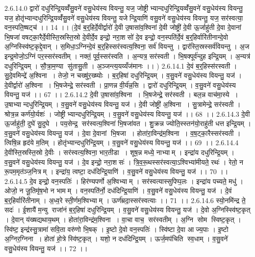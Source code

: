 2.6.14.0
द्वारो॑ दधुरिन्द्रि॒यव्वँ॑सु॒वने॑ वसु॒धेय॑स्य वियन्तु॒ यज॒ जोष्ट्रीभ्यान्दधुरिन्द्रि॒यव्वँ॑सु॒वने॑ वसु॒धेय॑स्य वियन्तु॒ यज॒ होतृ॑भ्यान्दधुरिन्द्रि॒यव्वँ॑सु॒वने॑ वसु॒धेय॑स्य वियन्तु॒ यजेन्द्रि॒याणि॑ वसु॒वने॑ वसु॒धेय॑स्य वियन्तु॒ यज॒ सर॑स्वत्या॒ वन॒स्पति॒ष्षट्च॑ ।। 14 ।। (दे॒वं ब॒र्॒हिर्दे॒वीर्द्वारो॑ दे॒वी उ॒षासा॑व॒श्विना॑ दे॒वी जोष्ट्री॑ दे॒वी ऊ॒र्जाहु॑ती दे॒वा दे॒वानां भि॒षजा॑ वषट्का॒रैर्दे॒वीस्ति॒स्रस्ति॒स्रो दे॒वीर्दे॒व इन्द्रो॒ नरा॒शसो॑ दे॒व इन्द्रो॒ वन॒स्पति॑र्दे॒वं ब॒र्॒हिर्वारि॑तीनान्दे॒वो अ॒ग्निस्स्वि॑ष्ट॒कृद्दे॒वान् । स॒मिधा॒ऽग्निन्दे॒वं ब॒र्॒हिस्सर॑स्वत्य॒श्विना॒ सर्व॑ वियन्तु । द्वार॑स्ति॒स्रस्सर्व॑वियन्तु । अ॒ज इन्द्र॒मोजो॒ऽग्निं पर॒स्सर॑स्वतीम् । नक्तं॒ पूर्व॒स्सर॑स्वति । अ॒न्यत्र॒ सर॑स्वती । भि॒षक्पूर्व॑न्दुह इन्द्रि॒यम् । अ॒न्यत्र॑ दधुरिन्द्रि॒यम् । सौ॒त्रा॒म॒ण्या सु॑तासु॒ती । अ॒ञ्जन्त्य॒यय्यँज॑मानः ।। )
2.6.14.1
दे॒वं ब॒र्॒हिस्स॑रस्वती । सु॒दे॒वमिन्द्रे॑ अ॒श्विना । तेजो॒ न चख्षु॑र॒ख्ष्योः । ब॒र्॒हिषा॑ दधुरिन्द्रि॒यम् । व॒सु॒वने॑ वसु॒धेय॑स्य वियन्तु॒ यज॑ । दे॒वीर्द्वारो॑ अ॒श्विना । भि॒षजेन्द्रे॒ सर॑स्वती । प्रा॒णन्न वी॒र्य॑न्न॒सि । द्वारो॑ दधुरिन्द्रि॒यम् । व॒सु॒वने॑ वसु॒धेय॑स्य वियन्तु॒ यज॑ ।। 67 ।।
2.6.14.2
दे॒वी उ॒षासा॑व॒श्विना । भि॒षजेन्द्रे॒ सर॑स्वती । बल॒न्न वाच॑मा॒स्ये । उ॒षाभ्यान्दधुरिन्द्रि॒यम् । व॒सु॒वने॑ वसु॒धेय॑स्य वियन्तु॒ यज॑ । दे॒वी जोष्ट्री॑ अ॒श्विना । सु॒त्रामेन्द्रे॒ सर॑स्वती । श्रोत्र॒न्न कर्ण॑यो॒र्यशः॑ । जोष्ट्रीभ्यान्दधुरिन्द्रि॒यम् । व॒सु॒वने॑ वसु॒धेय॑स्य वियन्तु॒ यज॑ ।। 68 ।।
2.6.14.3
दे॒वी ऊ॒र्जाहु॑ती॒ दुघे॑ सु॒दुघे । पय॒सेन्द्र॒॒ सर॑स्वत्य॒श्विना॑ भि॒षजा॑वत । शु॒क्रन्न ज्योति॒स्स्तन॑यो॒राहु॑ती धत्त इन्द्रि॒यम् । व॒सु॒वने॑ वसु॒धेय॑स्य वियन्तु॒ यज॑ । दे॒वा दे॒वानां भि॒षजा । होता॑रा॒विन्द्र॑म॒श्विना । व॒ष॒ट्का॒रैस्सर॑स्वती । त्विषि॒न्न हृद॑ये म॒तिम् । होतृ॑भ्यान्दधुरिन्द्रि॒यम् । व॒सु॒वने॑ वसु॒धेय॑स्य वियन्तु॒ यज॑ ।। 69 ।।
2.6.14.4
दे॒वीस्ति॒स्रस्ति॒स्रो दे॒वीः । सर॑स्वत्य॒श्विना॒ भार॒तीडा । शूष॒न्न मध्ये॒ नाभ्याम् । इन्द्रा॑य दधुरिन्द्रि॒यम् । व॒सु॒वने॑ वसु॒धेय॑स्य वियन्तु॒ यज॑ । दे॒व इन्द्रो॒ नरा॒शसः॑ । त्रि॒व॒रू॒थस्सर॑स्वत्या॒ऽश्विभ्या॑मीयते॒ रथः॑ । रेतो॒ न रू॒पम॒मृत॑ञ्ज॒नित्रम् । इन्द्रा॑य॒ त्वष्टा॒ दध॑दिन्द्रि॒याणि॑ । व॒सु॒वने॑ वसु॒धेय॑स्य वियन्तु॒ यज॑ ।। 70 ।।
2.6.14.5
दे॒व इन्द्रो॒ वन॒स्पतिः॑ । हिर॑ण्यपर्णो अ॒श्विभ्याम् । सर॑स्वत्यास्सुपिप्प॒लः । इन्द्रा॑य पच्यते॒ मधु॑ । ओजो॒ न जू॒तिमृ॑ष॒भो न भामम् । वन॒स्पति॑र्नो॒ दध॑दिन्द्रि॒याणि॑ । व॒सु॒वने॑ वसु॒धेय॑स्य वियन्तु॒ यज॑ । दे॒वं ब॒र्॒हिर्वारि॑तीनाम् । अ॒ध्व॒रे स्ती॒र्णम॒श्विभ्याम् । ऊर्ण॑म्रदा॒स्सर॑स्वत्याः ।। 71 ।।
2.6.14.6
स्यो॒नमि॑न्द्र ते॒ सदः॑ । ई॒शायै॑ म॒न्यु राजा॑नं ब॒र्॒हिषा॑ दधुरिन्द्रि॒यम् । व॒सु॒वने॑ वसु॒धेय॑स्य वियन्तु॒ यज॑ । दे॒वो अ॒ग्निस्स्वि॑ष्ट॒कृत् । दे॒वान् य॑ख्षद्यथाय॒थम् । होता॑रा॒विन्द्र॑म॒श्विना । वा॒चा वाच॒॒ सर॑स्वतीम् । अ॒ग्नि सोम॑ स्विष्ट॒कृत् । स्वि॑ष्ट॒ इन्द्र॑स्सु॒त्रामा॑ सवि॒ता वरु॑णो भि॒षक् । इ॒ष्टो दे॒वो वन॒स्पतिः॑ । स्वि॑ष्टा दे॒वा आज्य॒पाः । इ॒ष्टो अ॒ग्निर॒ग्निना । होता॑ हो॒त्रे स्वि॑ष्ट॒कृत् । यशो॒ न दध॑दिन्द्रि॒यम् । ऊर्ज॒मप॑चिति स्व॒धाम् । व॒सु॒वने॑ वसु॒धेय॑स्य वियन्तु॒ यज॑ ।। 72 ।।
